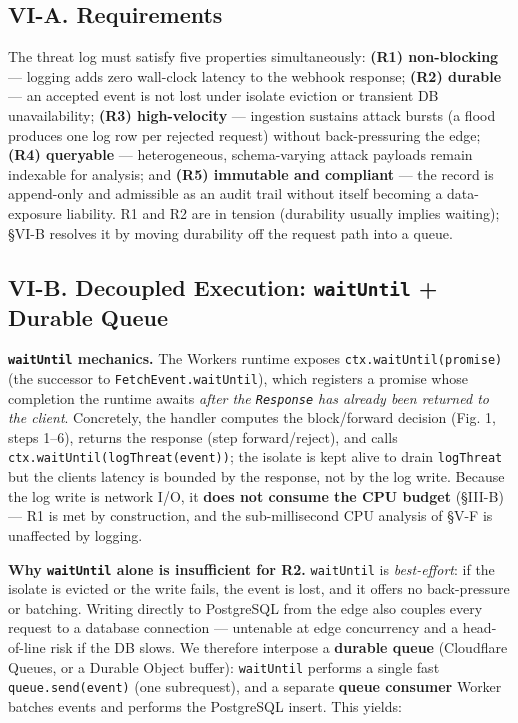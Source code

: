 \subsection{VI-A. Requirements}\label{vi-a-requirements}

The threat log must satisfy five properties simultaneously: \textbf{(R1)
non-blocking} --- logging adds zero wall-clock latency to the webhook
response; \textbf{(R2) durable} --- an accepted event is not lost under
isolate eviction or transient DB unavailability; \textbf{(R3)
high-velocity} --- ingestion sustains attack bursts (a flood produces
one log row per rejected request) without back-pressuring the edge;
\textbf{(R4) queryable} --- heterogeneous, schema-varying attack
payloads remain indexable for analysis; and \textbf{(R5) immutable and
compliant} --- the record is append-only and admissible as an audit
trail without itself becoming a data-exposure liability. R1 and R2 are
in tension (durability usually implies waiting); §VI-B resolves it by
moving durability off the request path into a queue.

\subsection{\texorpdfstring{VI-B. Decoupled Execution:
\texttt{waitUntil} + Durable
Queue}{VI-B. Decoupled Execution: waitUntil + Durable Queue}}\label{vi-b-decoupled-execution-waituntil--durable-queue}

\textbf{\passthrough{\lstinline!waitUntil!} mechanics.} The Workers
runtime exposes \passthrough{\lstinline!ctx.waitUntil(promise)!} (the
successor to \passthrough{\lstinline!FetchEvent.waitUntil!}), which
registers a promise whose completion the runtime awaits \emph{after the
\passthrough{\lstinline!Response!} has already been returned to the
client}. Concretely, the handler computes the block/forward decision
(Fig. 1, steps 1--6), returns the response (step forward/reject), and
calls \passthrough{\lstinline!ctx.waitUntil(logThreat(event))!}; the
isolate is kept alive to drain \passthrough{\lstinline!logThreat!} but
the client\textquotesingle s latency is bounded by the response, not by
the log write. Because the log write is network I/O, it \textbf{does not
consume the CPU budget} (§III-B) --- R1 is met by construction, and the
sub-millisecond CPU analysis of §V-F is unaffected by logging.

\textbf{Why \passthrough{\lstinline!waitUntil!} alone is insufficient
for R2.} \passthrough{\lstinline!waitUntil!} is \emph{best-effort}: if
the isolate is evicted or the write fails, the event is lost, and it
offers no back-pressure or batching. Writing directly to PostgreSQL from
the edge also couples every request to a database connection ---
untenable at edge concurrency and a head-of-line risk if the DB slows.
We therefore interpose a \textbf{durable queue} (Cloudflare Queues, or a
Durable Object buffer): \passthrough{\lstinline!waitUntil!} performs a
single fast \passthrough{\lstinline!queue.send(event)!} (one
subrequest), and a separate \textbf{queue consumer} Worker batches
events and performs the PostgreSQL insert. This yields:

